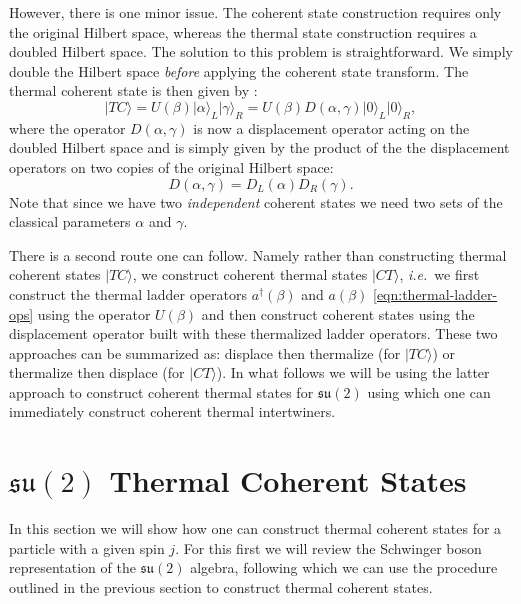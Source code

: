 \documentclass[twocolumn,draft,aps,nofootinbib,nobibnotes,final]{revtex4-2}
\newcommand{\ie}{\textit{i.e.}~}
\newcommand{\mf}[1]{\mathfrak{#1}}
\newcommand{\ket}[1]{\vert #1 \rangle}
\begin{document}
However, there is one minor issue. The coherent state construction requires only the original Hilbert space, whereas the thermal state construction requires a doubled Hilbert space. The solution to this problem is straightforward. We simply double the Hilbert space \textit{before} applying the coherent state transform. The thermal coherent state is then given by \cite{Guo2020Circuit} :
\begin{equation}\label{eqn:thermal-coherent-state}
	\ket{TC} = U(\beta) \ket{\alpha}_L \ket{\gamma}_R = U(\beta) D(\alpha, \gamma) \ket{0}_L \ket{0}_R,
\end{equation}
where the operator $ D(\alpha,\gamma) $ is now a displacement operator acting on the doubled Hilbert space and is simply given by the product of the the displacement operators on two copies of the original Hilbert space:
\begin{equation}\label{eqn:doubled-displacement}
	D(\alpha, \gamma) = D_L(\alpha) D_R(\gamma).
\end{equation}
Note that since we have two \textit{independent} coherent states we need two sets of the classical parameters $ \alpha $ and $ \gamma $.

There is a second route one can follow. Namely rather than constructing thermal coherent states $ \ket{TC} $, we construct coherent thermal states $ \ket{CT} $, \ie we first construct the thermal ladder operators $ a^\dagger(\beta) $ and $ a(\beta) $ \eqref{eqn:thermal-ladder-ops} using the operator $ U(\beta) $ and then construct coherent states using the displacement operator built with these thermalized ladder operators. These two approaches can be summarized as: displace then thermalize (for $ \ket{TC} $) or thermalize then displace (for $ \ket{CT} $). In what follows we will be using the latter approach to construct coherent thermal states for $ \mf{su}(2) $ using which one can immediately construct coherent thermal intertwiners.

\section{$ \mf{su}(2) $ Thermal Coherent States}\label{eqn:thermal-spin-state}

In this section we will show how one can construct thermal coherent states for a particle with a given spin $ j $. For this first we will review the Schwinger boson representation of the $ \mf{su}(2) $ algebra, following which we can use the procedure outlined in the previous section to construct thermal coherent states.
\end{document}
